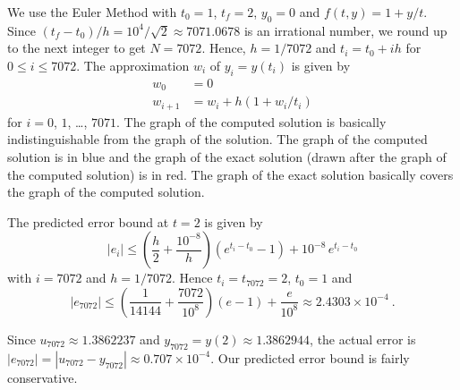 { We use the Euler Method with $t_0=1$, $t_f= 2$,
$y_0 = 0$ and $f(t,y) = 1 + y/t$.  Since
$(t_f-t_0)/h = 10^4/\sqrt{2} \approx 7071.0678$
is an irrational number, we round up to the next integer to get
$N = 7072$.   Hence, $h = 1/7072$ and $t_i = t_0 + ih$ for
$0\leq i \leq 7072$.  The approximation $w_i$ of $y_i = y(t_i)$ is
given by
\begin{align*}
w_0 & = 0 \\
w_{i+1} & = w_i + h(1 + w_i/t_i)
\end{align*}
for $i=0$, $1$, \ldots, $7071$.   The graph of the computed solution
is basically indistinguishable from the graph of the solution.
The graph of the computed solution is in blue and the graph of the
exact solution (drawn after the graph of the computed solution) is in
red.  The graph of the exact solution basically covers the graph of the
computed solution.

  The predicted error bound at $t=2$ is given by
\[
|e_i| \leq \left(\frac{h}{2} + \frac{10^{-8}}{h} \right)\left(
  e^{t_i-t_0} - 1 \right) + 10^{-8}\,e^{t_i-t_0}
\]
with $i=7072$ and $h=1/7072$.  Hence $t_i = t_{7072} = 2$, $t_0=1$ and
\[
|e_{7072}| \leq \left(\frac{1}{14144} + \frac{7072}{10^8} \right)
( e- 1) + \frac{e}{10^8} \approx 2.4303 \times 10^{-4} \ .
\]

Since $u_{7072} \approx 1.3862237$ and
$y_{7072} = y(2) \approx 1.3862944$, the actual error is
$|e_{7072}| = |u_{7072} - y_{7072}| \approx 0.707 \times 10^{-4}$.
Our predicted error bound is fairly conservative.
}

